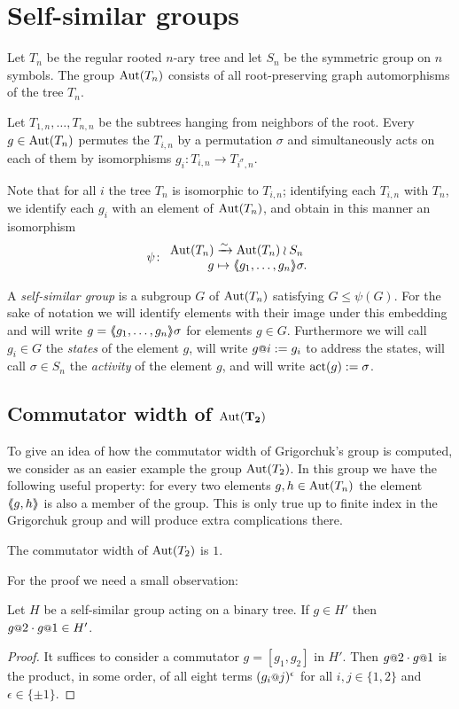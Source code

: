 \documentclass[a4paper,11pt]{amsart}
\begin{document}
\section{Self-similar groups}\label{sec:SelfSimilarGroups}
Let $T_n$ be the regular rooted $n$-ary tree and let $S_n$ be the symmetric group on $n$ symbols.
The group $\operatorname{{Aut}}(T_n)$ consists of all root-preserving graph automorphisms of the tree $T_n$. 

Let $T_{1,n},\dotsc,T_{n,n}$ be the subtrees hanging from neighbors of the root. 
Every $g\in\operatorname{{Aut}}(T_n)$ permutes the $T_{i,n}$ by a permutation $\sigma$ and simultaneously
acts on each of them by isomorphisms $g_i\colon T_{i,n}\to T_{i^\sigma,n}$.

Note that for all $i$ the tree $T_n$ is isomorphic to $T_{i,n}$;
identifying each $T_{i,n}$ with $T_n$, we identify each $g_i$ with an
element of $\operatorname{{Aut}}(T_n)$, and obtain in this manner an isomorphism
\[\psi\colon\begin{array}{r@{\;}l}
              \Aut(T_n) &\xrightarrow{\sim} \Aut(T_n)\wr S_n\\
              g &\mapsto \pair{g_1,\dotsc,g_n}\sigma.
            \end{array}
\]

A \emph{self-similar group} is a subgroup $G$ of $\operatorname{{Aut}}(T_n)$
satisfying $G\leq \psi(G)$.  For the sake of notation we will identify
elements with their image under this embedding and will write
$g=\langle\negthickspace\langle g_1,\dotsc,g_n\rangle\negthickspace\rangle\sigma$ for elements $g\in G$.  Furthermore we
will call $g_i\in G$ the \emph{states} of the element $g$, will write
$g\at{i}:=g_i$ to address the states, will call $\sigma \in S_n$ the
\emph{activity} of the element $g$, and will write $\operatorname{act}(g):= \sigma$.

\subsection{Commutator width of \texorpdfstring{$\mathbf{\textup{Aut}(T_2)}$}{Aut(T2)} }
To give an idea of how the commutator width of Grigorchuk's group is
computed, we consider as an easier example the group $\operatorname{{Aut}}(T_2)$. In
this group we have the following useful property: for every two
elements $g,h\in \operatorname{{Aut}}(T_n)$ the element $\langle\negthickspace\langle g,h\rangle\negthickspace\rangle$ is also a member
of the group.  This is only true up to finite index in the Grigorchuk
group and will produce extra complications there.

\begin{pro}\label{pro:comwidthAutT2}
 The commutator width of $\operatorname{{Aut}}(T_2)$ is $1$.
\end{pro}
For the proof we need a small observation:
\begin{lem}\label{lem:H'}
  Let $H$ be a self-similar group acting on a binary tree.
  If $g\in H'$ then $g\at{2}\cdot g\at{1}\in H'$. 
\end{lem}
\begin{proof}
  It suffices to consider a commutator $g=[g_1,g_2]$ in $H'$. Then
  $g\at 2\cdot g\at 1$ is the product, in some order, of all eight
  terms $(g_i\at j)^\epsilon$ for all $i,j\in\{1,2\}$ and
  $\epsilon\in\{\pm1\}$.
\end{proof}
\end{document}

